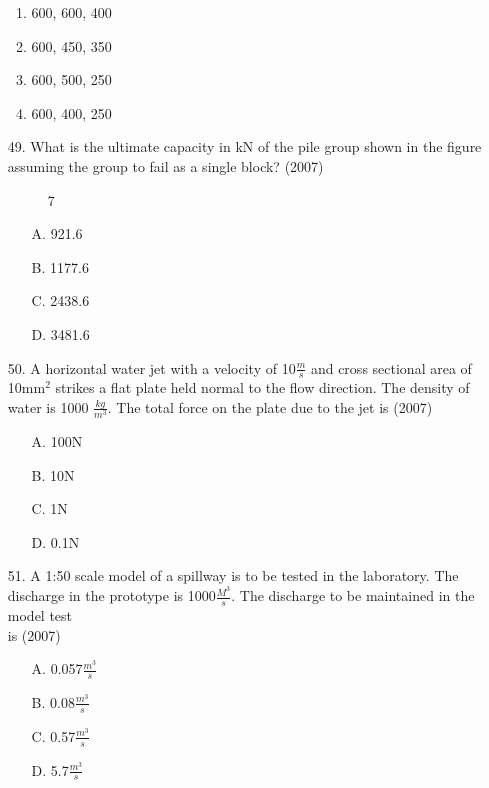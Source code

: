 \documentclass[journal]{IEEEtran}
\begin{document}
\begin{enumerate}
  \begin{enumerate}[label=\Alph*]
      \item 600, 600, 400
      \item 600, 450, 350
      \item 600, 500, 250
      \item 600, 400, 250
  \end{enumerate}
  \item [49.] What is the ultimate capacity in kN of the pile group shown in the figure
  assuming the group to fail as a single block? \hfill (2007)
  \begin{figure}[!ht]
    \centering
    \caption{7 }
    \label{fig:7}
  \end{figure}
  \begin{enumerate}
    \item [A.] 921.6
    \item [B.] 1177.6
    \item [C.] 2438.6
    \item [D.] 3481.6
  \end{enumerate}
  \item [50.] A horizontal water jet with a velocity of 10$\frac{m}{s}$ and cross sectional area of 10mm$^2$
  strikes a flat plate held normal to the flow direction. The density of water is 1000
  $\frac{kg}{m^3}$. The total force on the plate due to the jet is  \hfill (2007)
  \begin{enumerate}
    \item [A.] 100N
    \item [B.] 10N 
    \item [C.] 1N 
    \item [D.] 0.1N 
  \end{enumerate}
  \item [51.] A 1:50 scale model of a spillway is to be tested in the laboratory. The discharge in
  the prototype is 1000$\frac{M^3}{s}$. The discharge to be maintained in the model test \\ is \hfill (2007) 
  \begin{enumerate}
    \item [A.] 0.057$\frac{m^3}{s}$ 
    \item [B.] 0.08$\frac{m^3}{s}$
    \item [C.] 0.57$\frac{m^3}{s}$ 
    \item [D.] 5.7$\frac{m^3}{s}$
  \end{enumerate}
\end{enumerate}
\end{document}
